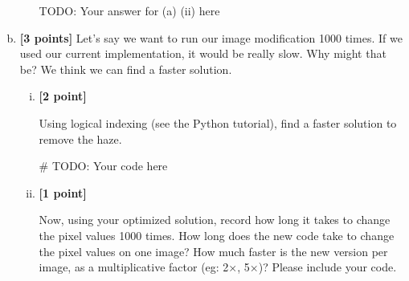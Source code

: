 \documentclass[11pt]{article}
\begin{document}
\begin{enumerate}[(a)]
\begin{enumerate}[(i)]
\begin{tcolorbox}[colback=white!5!white,colframe=green!75!black,height=10cm]
{{    TODO: Your answer for (a) (ii) here %
    
    }}
\end{tcolorbox}

\end{enumerate}

\item \textbf{[3 points]} Let's say we want to run our image modification 1000 times. If we used our current implementation, it would be really slow. Why might that be? We think we can find a faster solution.

\begin{enumerate}[(i)]
\item \textbf{[2 point]}
\begin{tcolorbox}[colback=orange!5!white,colframe=orange!75!black] 
Using logical indexing (see the Python tutorial), find a faster solution to remove the haze. 
\end{tcolorbox}

\begin{tcolorbox}[colback=white!5!white,colframe=green!75!black,height=3cm]
    \begin{python}
    # TODO: Your code here
    \end{python}
\end{tcolorbox}

\item \textbf{[1 point]}
\begin{tcolorbox}[colback=orange!5!white,colframe=orange!75!black]
Now, using your optimized solution, record how long it takes to change the pixel values 1000 times. How long does the new code take to change the pixel values on one image? How much faster is the new version per image, as a
multiplicative factor (eg: 2×, 5×)? Please include your code.
\end{tcolorbox}


\end{enumerate}
\end{enumerate}
\end{document}
